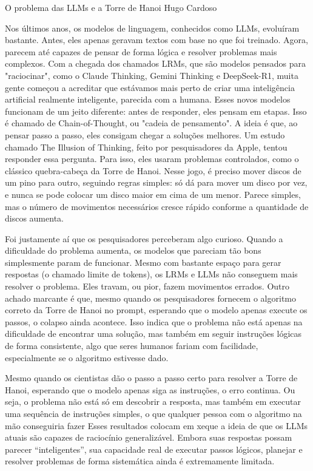 \hypearticle
{O problema das LLMs e a Torre de Hanoi}
{Hugo Cardoso}
{

\hspace*{1.5em} Nos últimos anos, os modelos de linguagem, conhecidos como LLMs, evoluíram bastante. Antes, eles apenas geravam textos com base no que foi treinado. Agora, parecem até capazes de pensar de forma lógica e resolver problemas mais complexos. Com a chegada dos chamados LRMs, que são modelos pensados para "raciocinar", como o Claude Thinking, Gemini Thinking e DeepSeek-R1, muita gente começou a acreditar que estávamos mais perto de criar uma inteligência artificial realmente inteligente, parecida com a humana.
\hspace*{1.5em} Esses novos modelos funcionam de um jeito diferente: antes de responder, eles pensam em etapas. Isso é chamado de Chain-of-Thought, ou "cadeia de pensamento". A ideia é que, ao pensar passo a passo, eles consigam chegar a soluções melhores.
\hspace*{1.5em} Um estudo chamado The Illusion of Thinking, feito por pesquisadores da Apple, tentou responder essa pergunta. Para isso, eles usaram problemas controlados, como o clássico quebra-cabeça da Torre de Hanoi. Nesse jogo, é preciso mover discos de um pino para outro, seguindo regras simples: só dá para mover um disco por vez, e nunca se pode colocar um disco maior em cima de um menor. Parece simples, mas o número de movimentos necessários cresce rápido conforme a quantidade de discos aumenta.

\subtitle{O colapso dos modelos de LRM e LLMs}
\hspace*{1.5em} Foi justamente aí que os pesquisadores perceberam algo curioso. Quando a dificuldade do problema aumenta, os modelos que pareciam tão bons simplesmente param de funcionar. Mesmo com bastante espaço para gerar respostas (o chamado limite de tokens), os LRMs e LLMs não conseguem mais resolver o problema. Eles travam, ou pior, fazem movimentos errados.
\hspace*{1.5em} Outro achado marcante é que, mesmo quando os pesquisadores fornecem o algoritmo correto da Torre de Hanoi no prompt, esperando que o modelo apenas execute os passos, o colapso ainda acontece. Isso indica que o problema não está apenas na dificuldade de encontrar uma solução, mas também em seguir instruções lógicas de forma consistente, algo que seres humanos fariam com facilidade, especialmente se o algoritmo estivesse dado.

\subtitle{E tem mais: }
\hspace*{1.5em} Mesmo quando os cientistas dão o passo a passo certo para resolver a Torre de Hanoi, esperando que o modelo apenas siga as instruções, o erro continua. Ou seja, o problema não está só em descobrir a resposta, mas também em executar uma sequência de instruções simples, o que qualquer pessoa com o algoritmo na mão conseguiria fazer
\hspace*{1.5em} Esses resultados colocam em xeque a ideia de que os LLMs atuais são capazes de raciocínio generalizável. Embora suas respostas possam parecer “inteligentes”, sua capacidade real de executar passos lógicos, planejar e resolver problemas de forma sistemática ainda é extremamente limitada.

}